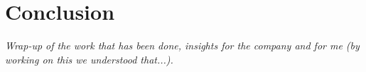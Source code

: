 \chapter{Conclusion}
\label{cha:conclusion}
\textit{Wrap-up of the work that has been done, insights for the company and for me (by working on this we understood that...).}

